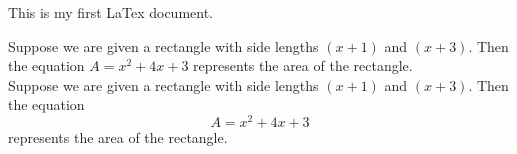 \documentclass{article}
\begin{document}
This is my first LaTex document.

Suppose we are given a rectangle with side
lengths $(x+1)$ and $(x+3)$. Then the equation $A=x^2+4x+3$ represents the area of the rectangle.
\\Suppose we are given a rectangle with side
lengths $(x+1)$ and $(x+3)$. Then the equation$$A=x^2+4x+3$$ represents the area of the rectangle.
\end{document}
